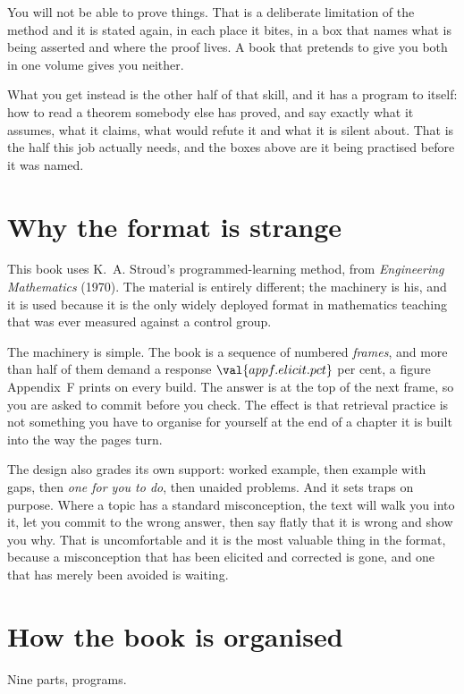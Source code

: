 You will not be able to prove things. That is a deliberate limitation of the
method and it is stated again, in each place it bites, in a box that names what
is being asserted and where the proof lives. A book that pretends to give you
both in one volume gives you neither.

What you get instead is the other half of that skill, and it has a program to
itself: how to read a theorem somebody else has proved, and say exactly what it
assumes, what it claims, what would refute it and what it is silent about. That
is the half this job actually needs, and the boxes above are it being practised
before it was named.

\section*{Why the format is strange}

This book uses K.~A. Stroud's programmed-learning method, from
\emph{Engineering Mathematics} (1970). The material is entirely different; the
machinery is his, and it is used because it is the only widely deployed format
in mathematics teaching that was ever measured against a control group.

The machinery is simple. The book is a sequence of numbered \emph{frames},
and more than half of them demand a response \dash{} $\val{appf.elicit.pct}$
per cent, a figure Appendix~F prints on every build. The answer is at the top
of the next frame, so you are asked to commit before you check. The effect is
that retrieval practice is not something you have to organise for yourself at
the end of a chapter \dash{} it is built into the way the pages turn.

The design also grades its own support: worked example, then example with gaps,
then \emph{one for you to do}, then unaided problems. And it sets traps on
purpose. Where a topic has a standard misconception, the text will walk you
into it, let you commit to the wrong answer, then say flatly that it is wrong
and show you why. That is uncomfortable and it is the most valuable thing in
the format, because a misconception that has been elicited and corrected is
gone, and one that has merely been avoided is waiting.

\section*{How the book is organised}

Nine parts,  programs.

